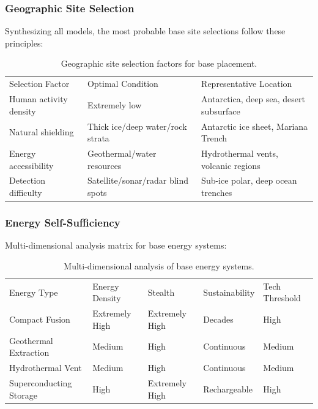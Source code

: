 \documentclass[aps,prd,twocolumn,superscriptaddress,nofootinbib]{revtex4-2}
\begin{document}
\subsubsection{Geographic Site Selection}\label{sec:site-selection}

Synthesizing all models, the most probable base site selections follow these principles:

\begin{table}[htbp]
\caption{Geographic site selection factors for base placement.}
\label{tab:site-selection}
\begin{ruledtabular}
\begin{tabular}{lll}
Selection Factor & Optimal Condition & Representative Location \\
\colrule
Human activity density & Extremely low & Antarctica, deep sea, desert subsurface \\
Natural shielding & Thick ice/deep water/rock strata & Antarctic ice sheet, Mariana Trench \\
Energy accessibility & Geothermal/water resources & Hydrothermal vents, volcanic regions \\
Detection difficulty & Satellite/sonar/radar blind spots & Sub-ice polar, deep ocean trenches \\
\end{tabular}
\end{ruledtabular}
\end{table}

\subsubsection{Energy Self-Sufficiency}\label{sec:energy-self}

Multi-dimensional analysis matrix for base energy systems:

\begin{table}[htbp]
\caption{Multi-dimensional analysis of base energy systems.}
\label{tab:energy-matrix}
\begin{ruledtabular}
\begin{tabular}{lllll}
Energy Type & Energy Density & Stealth & Sustainability & Tech Threshold \\
\colrule
Compact Fusion & Extremely High & Extremely High & Decades & High \\
Geothermal Extraction & Medium & High & Continuous & Medium \\
Hydrothermal Vent & Medium & High & Continuous & Medium \\
Superconducting Storage & High & Extremely High & Rechargeable & High \\
\end{tabular}
\end{ruledtabular}
\end{table}
\end{document}
